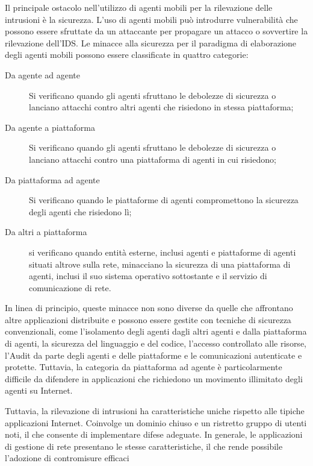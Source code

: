 \smallskip
Il principale ostacolo nell'utilizzo di agenti mobili per la rilevazione delle intrusioni è la sicurezza. L'uso di agenti mobili può introdurre vulnerabilità che possono essere sfruttate da un attaccante per propagare un attacco o sovvertire la rilevazione dell'IDS. Le minacce alla sicurezza per il paradigma di elaborazione degli agenti mobili possono essere classificate in quattro categorie:
\begin{description}
    \item [Da agente ad agente] Si verificano quando gli agenti sfruttano le debolezze di sicurezza o lanciano attacchi contro altri agenti che risiedono in stessa piattaforma;
    \item [Da agente a piattaforma]  Si verificano quando gli agenti sfruttano le debolezze di sicurezza o lanciano attacchi contro una piattaforma di agenti in cui risiedono;
    \item [Da piattaforma ad agente]  Si verificano quando le piattaforme di agenti compromettono la sicurezza degli agenti che risiedono lì;
    \item [Da altri a piattaforma] si verificano quando entità esterne, inclusi agenti e piattaforme di agenti situati altrove sulla rete, minacciano la sicurezza di una piattaforma di agenti, inclusi il suo sistema operativo sottostante e il servizio di comunicazione di rete.
\end{description}

\smallskip

In linea di principio, queste minacce non sono diverse da quelle che affrontano altre applicazioni distribuite e possono essere gestite con tecniche di sicurezza convenzionali, come l'isolamento degli agenti dagli altri agenti e dalla piattaforma di agenti, la sicurezza del linguaggio e del codice, l'accesso controllato alle risorse, l'Audit da parte degli agenti e delle piattaforme e le comunicazioni autenticate e protette. Tuttavia, la categoria da piattaforma ad agente è particolarmente difficile da difendere in applicazioni che richiedono un movimento illimitato degli agenti su Internet.

Tuttavia, la rilevazione di intrusioni ha caratteristiche uniche rispetto alle tipiche applicazioni Internet. Coinvolge un dominio chiuso e un ristretto gruppo di utenti noti, il che consente di implementare difese adeguate. In generale, le applicazioni di gestione di rete presentano le stesse caratteristiche, il che rende possibile l'adozione di contromisure efficaci

